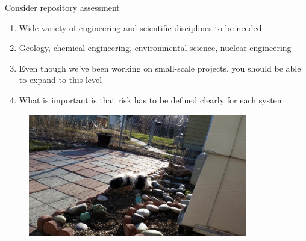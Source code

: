 \documentclass[aspectratio=1610,pdftex,dvipsnames,compress,xcolor={dvipsnames}]{beamer}
\newcommand{\acs}{\acrshort} %
\begin{document}
\begin{frame}{Consider repository assessment}
    \begin{enumerate}[series=outerlist,topsep=0pt,itemsep=21pt,leftmargin=*,label=(\arabic*)]
        \item[]Wide variety of engineering and scientific disciplines to be needed
        \item[]Geology, chemical engineering, environmental science, nuclear engineering
        \item[]Even though we've been working on small-scale projects, you should be able to expand to this level
        \item[]What is important is that risk has to be defined clearly for each system
    \end{enumerate}
\end{frame}


\begin{frame}[plain]{}
    \begin{figure}
        \centering
        \includegraphics[width=0.85\textwidth]{final.jpg}
    \end{figure}
\end{frame}


%
%
%



%    
%    
\end{document}
